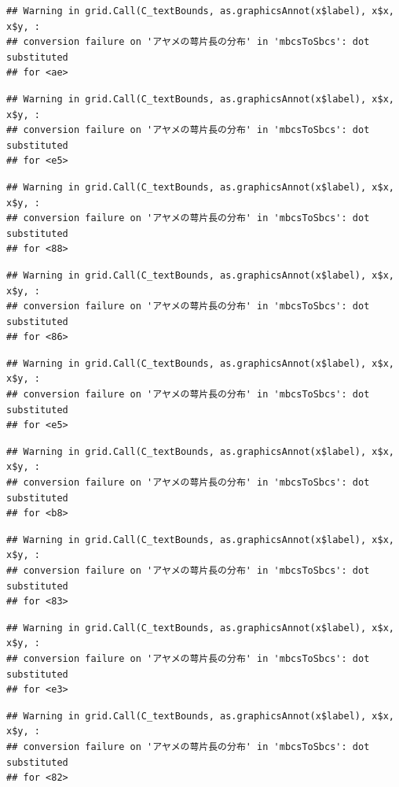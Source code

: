 \documentclass[
]{book}
\begin{document}
\begin{verbatim}
## Warning in grid.Call(C_textBounds, as.graphicsAnnot(x$label), x$x, x$y, :
## conversion failure on 'アヤメの萼片長の分布' in 'mbcsToSbcs': dot substituted
## for <ae>
\end{verbatim}

\begin{verbatim}
## Warning in grid.Call(C_textBounds, as.graphicsAnnot(x$label), x$x, x$y, :
## conversion failure on 'アヤメの萼片長の分布' in 'mbcsToSbcs': dot substituted
## for <e5>
\end{verbatim}

\begin{verbatim}
## Warning in grid.Call(C_textBounds, as.graphicsAnnot(x$label), x$x, x$y, :
## conversion failure on 'アヤメの萼片長の分布' in 'mbcsToSbcs': dot substituted
## for <88>
\end{verbatim}

\begin{verbatim}
## Warning in grid.Call(C_textBounds, as.graphicsAnnot(x$label), x$x, x$y, :
## conversion failure on 'アヤメの萼片長の分布' in 'mbcsToSbcs': dot substituted
## for <86>
\end{verbatim}

\begin{verbatim}
## Warning in grid.Call(C_textBounds, as.graphicsAnnot(x$label), x$x, x$y, :
## conversion failure on 'アヤメの萼片長の分布' in 'mbcsToSbcs': dot substituted
## for <e5>
\end{verbatim}

\begin{verbatim}
## Warning in grid.Call(C_textBounds, as.graphicsAnnot(x$label), x$x, x$y, :
## conversion failure on 'アヤメの萼片長の分布' in 'mbcsToSbcs': dot substituted
## for <b8>
\end{verbatim}

\begin{verbatim}
## Warning in grid.Call(C_textBounds, as.graphicsAnnot(x$label), x$x, x$y, :
## conversion failure on 'アヤメの萼片長の分布' in 'mbcsToSbcs': dot substituted
## for <83>
\end{verbatim}

\begin{verbatim}
## Warning in grid.Call(C_textBounds, as.graphicsAnnot(x$label), x$x, x$y, :
## conversion failure on 'アヤメの萼片長の分布' in 'mbcsToSbcs': dot substituted
## for <e3>
\end{verbatim}

\begin{verbatim}
## Warning in grid.Call(C_textBounds, as.graphicsAnnot(x$label), x$x, x$y, :
## conversion failure on 'アヤメの萼片長の分布' in 'mbcsToSbcs': dot substituted
## for <82>
\end{verbatim}
\end{document}
